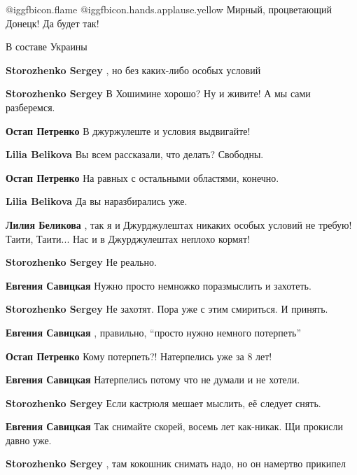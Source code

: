 \begin{itemize}
\begin{itemize}
\end{itemize} %


 @igg{fbicon.flame}  @igg{fbicon.hands.applause.yellow} Мирный, процветающий Донецк! Да будет так!

\begin{itemize} %
В составе Украины

\textbf{Storozhenko Sergey} , но без каких-либо особых условий

\textbf{Storozhenko Sergey} В Хошимине хорошо? Ну и живите! А мы сами разберемся.

\textbf{Остап Петренко} В джуржулеште и условия выдвигайте!

\textbf{Lilia Belikova} Вы всем рассказали, что делать? Свободны.

\textbf{Остап Петренко} На равных с остальными областями, конечно.

\textbf{Lilia Belikova} Да вы наразбирались уже.

\textbf{Лилия Беликова} , так я и Джурджулештах никаких особых условий не требую! Таити, Таити... Нас и в Джурджулештах неплохо кормят!

\textbf{Storozhenko Sergey}
Не реально.

\textbf{Евгения Савицкая} Нужно просто немножко поразмыслить и захотеть.

\textbf{Storozhenko Sergey}
Не захотят. Пора уже с этим смириться. И принять.

\textbf{Евгения Савицкая} , правильно, \enquote{просто нужно немного потерпеть}

\textbf{Остап Петренко}
Кому потерпеть?! Натерпелись уже за 8 лет!

\textbf{Евгения Савицкая} Натерпелись потому что не думали и не хотели.

\textbf{Storozhenko Sergey}
Если кастрюля мешает мыслить, её следует снять.

\textbf{Евгения Савицкая} Так снимайте скорей, восемь лет как-никак. Щи прокисли давно уже.

\textbf{Storozhenko Sergey} , там кокошник снимать надо, но он намертво прикипел


\end{itemize}
\end{itemize}

